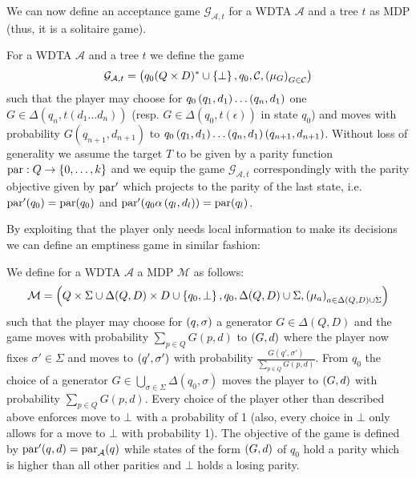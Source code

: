 We can now define an acceptance game $\mathcal{G}_{\mathcal{A}, t}$ for a
\ac{WDTA} $\mathcal{A}$ and a tree $t$ as \ac{MDP} (thus, it is a solitaire
game).
\begin{definition}
  For a \ac{WDTA} $\mathcal{A}$ and a tree $t$ we define the game
  \begin{equation}
    \mathcal{G}_{\mathcal{A}, t} = \left(q_{0}(Q\times D)^{*}\cup\left\{\bot\right\},
    q_{0}, \mathcal{C}, \left(\mu_{G}\right)_{G\in\mathcal{C}}\right)
  \end{equation}
  such that the player may choose for
  $q_{0}\left(q_{1}, d_{1}\right)\dots\left(q_{n}, d_{1}\right)$ one
  $G\in\Delta(q_{n}, t(d_{1}\dots d_{n}))$ (resp.
  $G\in\Delta(q_{0}, t(\epsilon))$ in state $q_{0}$)
  and moves with probability $G(q_{n+1}, d_{n+1})$ to
  $q_{0}\left(q_{1}, d_{1}\right)\dots\left(q_{n}, d_{1}\right)\left(q_{n+1}, d_{n+1}\right)$.
  Without loss of generality we assume the target $T$ to be given by a parity
  function $\operatorname{par}:Q\rightarrow \left\{0,\dots, k\right\}$ and we equip the game
  $\mathcal{G}_{\mathcal{A}, t}$ correspondingly with the parity objective given
  by $\operatorname{par}'$ which projects to the parity of the last state, i.e.
  $\operatorname{par}'(q_0) = \operatorname{par}(q_0)$ and $\operatorname{par}'(q_0\alpha\left(q_{l}, d_{l}\right)) = \operatorname{par}(q_{l})$.
\end{definition}
By exploiting that the player only needs local information to make its
decisions we can define an emptiness game in similar fashion:
\begin{definition}
  We define for a \ac{WDTA} $\mathcal{A}$ a \ac{MDP} $\mathcal{M}$ as follows:
  \begin{equation}
    \mathcal{M} = \left(Q\times\Sigma\cup\Delta(Q, D)\times D\cup\left\{q_{0},\bot\right\},
    q_{0}, \Delta(Q, D)\cup\Sigma, \left(\mu_a\right)_{a\in\Delta(Q, D)\cup\Sigma}\right)
  \end{equation}
  such that the player may choose for $\left(q,\sigma\right)$ a generator
  $G\in\Delta(Q, D)$ and the game moves with probability
  $\sum\limits_{p\in Q}G(p, d)$ to $\left(G, d\right)$ where the player now fixes
  $\sigma'\in\Sigma$ and moves to $\left(q', \sigma'\right)$ with probability
  $\frac{G(q',\sigma')}{\sum\limits_{p\in Q}G(p, d)}$. From $q_{0}$ the choice
  of a generator $G\in\bigcup\limits_{\sigma\in\Sigma}\Delta(q_{0}, \sigma)$
  moves the player to $\left(G, d\right)$ with probability
  $\sum\limits_{p\in Q}G(p, d)$.
  Every choice of the player other than described above enforces move to $\bot$
  with a probability of 1 (also, every choice in $\bot$ only allows
  for a move to $\bot$ with probability 1). The objective of the game is
  defined by $\operatorname{par}'(q,d) = \operatorname{par}_{\mathcal{A}}(q)$ while states of the
  form $\left(G, d\right)$ of $q_{0}$ hold a parity which is higher than all other
  parities and $\bot$ holds a losing parity. 
\end{definition}
